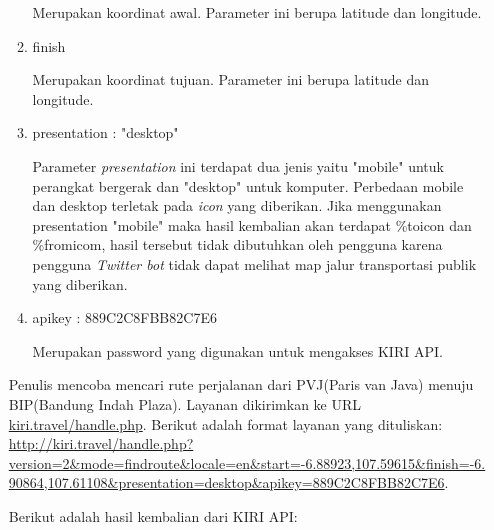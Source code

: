 \begin{itemize}
\begin{enumerate}
		Merupakan koordinat awal. Parameter ini berupa latitude dan longitude.
		\item finish
		
		Merupakan koordinat tujuan. Parameter ini berupa latitude dan longitude.
		\item presentation : "desktop"
		
		Parameter \textit{presentation} ini terdapat dua jenis yaitu "mobile" untuk perangkat bergerak dan "desktop" untuk komputer. Perbedaan mobile dan desktop terletak pada \textit{icon} yang diberikan. Jika menggunakan presentation "mobile" maka hasil kembalian akan terdapat \%toicon dan \%fromicom, hasil tersebut tidak dibutuhkan oleh pengguna karena pengguna \textit{Twitter bot} tidak dapat melihat map jalur transportasi publik yang diberikan.
		\item apikey : 889C2C8FBB82C7E6
		
		Merupakan password yang digunakan untuk mengakses KIRI API.
	\end{enumerate}
	
	Penulis mencoba mencari rute perjalanan dari PVJ(Paris van Java) menuju BIP(Bandung Indah Plaza). Layanan dikirimkan ke URL \url{kiri.travel/handle.php}. Berikut adalah format layanan yang dituliskan:
	\url{http://kiri.travel/handle.php?version=2\&mode=findroute\&locale=en\&start=-6.88923,107.59615\&finish=-6.90864,107.61108\&presentation=desktop\&apikey=889C2C8FBB82C7E6}.
	
	Berikut adalah hasil kembalian dari KIRI API:
	

\end{itemize}
